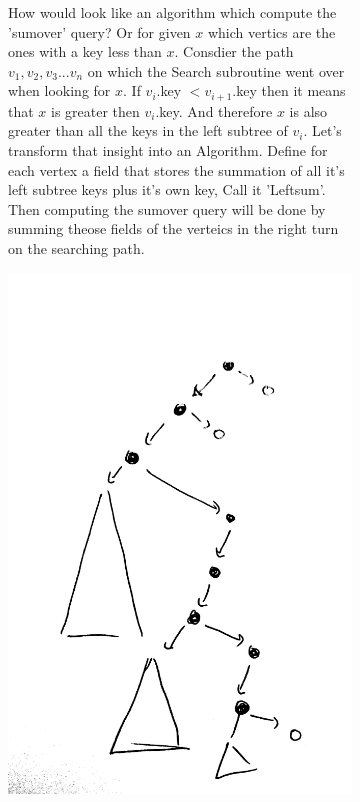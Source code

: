 \begin{figure}[H]
  \begin{subfigure}[b]{0.46\textwidth}
How would look like an algorithm which compute the 'sumover' query? Or for given $x$ which vertics are the ones with a key less than $x$. 
Consdier the path $v_1,v_2,v_3...v_n$ on which the Search subroutine went over when looking for $x$. If $v_i$.key $ <  v_{i+1}$.key then it means that $x$ is 
greater then $v_{i}$.key. And therefore $x$ is also greater than all the keys in the left subtree of $v_{i}$. Let's transform that insight into an 
Algorithm. Define for each vertex a field that stores the summation of all it's left subtree keys plus it's own key, Call it 'Leftsum'.  
Then computing the sumover query will be done by summing theose fields of the verteics in the right turn on the searching path. 
\end{subfigure} 
\hfill
\begin{subfigure}[b]{0.49\textwidth}
  \includegraphics[scale=0.08]{oavl-q.png}
   \end{subfigure} 
   \hfill
\end{figure}


